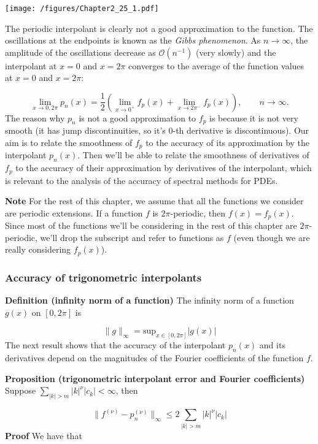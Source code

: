 \documentclass[12pt,landscape]{article}
\begin{document}
{\texttt{[image: /figures/Chapter2\_25\_1.pdf]}

The periodic interpolant is clearly not a good approximation to the function.  The oscillations at the endpoints is known as the \emph{Gibbs phenomenon}.  As $n \to \infty$, the amplitude of the oscillations decrease as $\mathcal{O}(n^{-1})$ (very slowly) and the interpolant at $x=0$ and $x =2\pi$ converges to the average of the function values at  $x=0$ and $x =2\pi$:

\[
\lim_{x\to 0, 2\pi}p_n(x) = \frac{1}{2}\left(\lim_{x \to 0^{+}}f_p(x) + \lim_{x \to 2\pi^{-}}f_p(x)\right), \qquad n \to \infty.
\]
The reason why $p_n$ is not a good approximation to $f_p$ is because it is not very smooth (it has jump discontinuities, so it's $0$-th derivative is discontinuous). Our aim is to relate the smoothness of $f_p$ to the accuracy of its approximation by the interpolant $p_n(x)$.  Then we'll be able to relate the smoothness of derivatives of $f_p$ to the accuracy of their approximation by derivatives of the interpolant, which is relevant to the analysis of the accuracy of spectral methods for PDEs.

\textbf{Note} For the rest of this chapter, we assume that all the functions we consider are periodic extensions. If a function $f$ is $2\pi$-periodic, then $f(x) = f_p(x)$. Since most of the functions we'll be considering in the rest of this chapter are $2\pi$-periodic, we'll drop the subscript and refer to functions as $f$ (even though we are really considering $f_p(x)$).

\subsubsection{Accuracy of trigonometric interpolants}
\textbf{Definition (infinity norm of a function)} The infinity norm of a function $g(x)$ on $[0, 2\pi]$ is 

\[
\| g \|_{\infty} = \mathrm{sup}_{x\in[0,2\pi]} \vert g(x) \vert
\]
The next result shows that the accuracy of the interpolant $p_n(x)$ and its derivatives depend on the magnitudes of the Fourier coefficients of the function $f$. 

\textbf{Proposition (trigonometric interpolant error and Fourier coefficients)} Suppose $\sum_{\vert k \vert > m} \vert k \vert^{\nu} \vert c_k \vert < \infty$, then

\[
\| f^{(\nu)} - p_n^{(\nu)}  \|_{\infty} \leq  2\sum_{\vert k \vert > m} \vert k \vert^{\nu} \vert c_k \vert 
\]
\textbf{Proof} We have that


}
\end{document}
